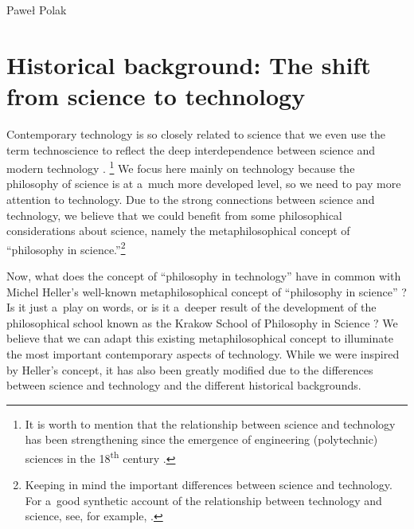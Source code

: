 \begin{artengenv}{Paweł Polak}
\section{Historical background: The shift from science to technology}

Contemporary technology is so closely related to science that we even use the term technoscience to reflect the deep interdependence between science and modern technology 
\parencite[][]{hottois_technoscience_2023}.%
\footnote{It is worth to mention that the relationship between science and technology has been strengthening since the emergence of engineering (polytechnic) sciences in the 18\textsuperscript{th} century 
\parencite[][p.669]{janeczek_nauka_2019}.%
} We focus here mainly on technology because the philosophy of science is at a~much more developed level, so we need to pay more attention to technology. Due to the strong connections between science and technology, we believe that we could benefit from some philosophical considerations about science, namely the metaphilosophical concept of ``philosophy in science.''\footnote{Keeping in mind the important differences between science and technology. For a~good synthetic account of the relationship between technology and science, see, for example, 
\parencite[][]{franssen_philosophy_2023}.%
}



Now, what does the concept of ``philosophy in technology'' have in common with Michel Heller's well-known metaphilosophical concept of ``philosophy in science'' 
\parencites[][]{heller_how_2019}[see also][]{polak_philosophy_2019}? %
 Is it just a~play on words, or is it a~deeper result of the development of the philosophical school known as the Krakow School of Philosophy in Science 
\parencite[][]{polak_krakow_2022}? %
 We believe that we can adapt this existing metaphilosophical concept to illuminate the most important contemporary aspects of technology. While we were inspired by Heller's concept, it has also been greatly modified due to the differences between science and technology and the different historical backgrounds.




\end{artengenv}
